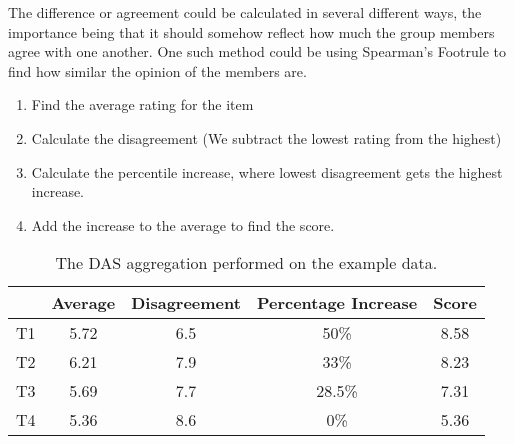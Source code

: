 The difference or agreement could be calculated in several different ways, the importance being that it should somehow reflect how much the group members agree with one another. One such method could be using Spearman's Footrule to find how similar the opinion of the members are.


\begin{enumerate}
	\item Find the average rating for the item
	\item Calculate the disagreement (We subtract the lowest rating from the highest)
	\item Calculate the percentile increase, where lowest disagreement gets the highest increase.
	\item Add the increase to the average to find the score.
\end{enumerate}

\begin{table}[H]
	\centering
	\begin{tabular}{|l|c|c|c|c|}
		\hline
		& \multicolumn{1}{l|}{Average} & \multicolumn{1}{l|}{Disagreement} & \multicolumn{1}{l|}{Percentage Increase} & \multicolumn{1}{l|}{Score} \\ \hline
		T1 & 5.72                         & 6.5                               & 50\%                                     & 8.58                       \\ \hline
		T2 & 6.21                         & 7.9                               & 33\%                                     & 8.23                       \\ \hline
		T3 & 5.69                         & 7.7                               & 28.5\%                                   & 7.31                       \\ \hline
		T4 & 5.36                         & 8.6                               & 0\%                                      & 5.36                       \\ \hline
	\end{tabular}
	\caption{The DAS aggregation performed on the example data.}
	\label{tbl:DASexample}
\end{table}